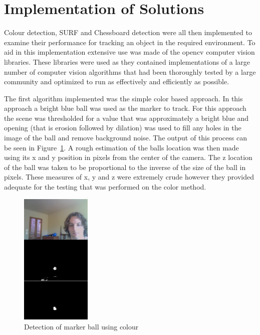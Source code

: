\section{Implementation of Solutions}

Colour detection, SURF and Chessboard detection were all then implemented to examine their performance for tracking an object in the required environment. To aid in this implementation extensive use was made of the opencv computer vision libraries. These libraries were used as they contained implementations of a large number of computer vision algorithms that had been thoroughly tested by a large community and optimized to run as effectively and efficiently as possible.

The first algorithm implemented was the simple color based approach. In this approach a bright blue ball was used as the marker to track. For this approach the scene was thresholded for a value that was approximately  a bright blue and opening (that is erosion followed by dilation) was used to fill any holes in the image of the ball and remove background noise. The output of this process can be seen in Figure~\ref{ball}. A rough estimation of the balls location was then made using its x and y position in pixels from the center of the camera. The z location of the ball was taken to be proportional to the inverse of the size of the ball in pixels. These measures of x, y and z were extremely crude however they provided adequate for the testing that was performed on the color method.

\begin{figure}[ht]
	\begin{center}
		\includegraphics[width=0.3\textwidth]{2}
	\end{center}
	\caption{Detection of marker ball using colour}
	\label{ball}
\end{figure}

